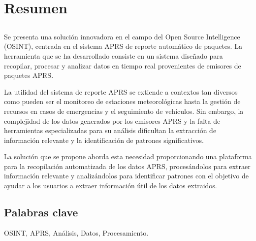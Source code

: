 \chapter*{Resumen}

\section*{\tituloPortadaVal}

Se presenta una solución innovadora en el campo del Open Source Intelligence (OSINT), centrada en el sistema APRS de reporte automático de paquetes. La herramienta que se ha desarrollado consiste en un sistema diseñado para recopilar, procesar y analizar datos en tiempo real provenientes de emisores de paquetes APRS.

	La utilidad del sistema de reporte APRS se extiende a contextos tan diversos como pueden ser el monitoreo de estaciones meteorológicas hasta la gestión de recursos en casos de emergencias y el seguimiento de vehículos. Sin embargo, la complejidad de los datos generados por los emisores APRS y la falta de herramientas especializadas para su análisis dificultan la extracción de información relevante y la identificación de patrones significativos.

	La solución que se propone aborda esta necesidad proporcionando una plataforma para la recopilación automatizada de los datos APRS, procesándolos para extraer información relevante y analizándolos para identificar patrones con el objetivo de ayudar a los usuarios a extraer información útil de los datos extraidos.


\section*{Palabras clave}
   
\noindent OSINT, APRS, Análisis, Datos, Procesamiento.

   


